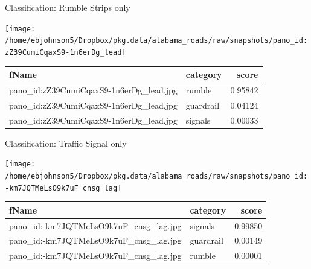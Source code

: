 \documentclass[ignorenonframetext,]{beamer}
\begin{document}
\begin{frame}{Classification: Rumble Strips only}

\begin{center}\texttt{[image: /home/ebjohnson5/Dropbox/pkg.data/alabama\_roads/raw/snapshots/pano\_id:zZ39CumiCqaxS9-1n6erDg\_lead]} \end{center}

\begin{table}[H]
\centering\begingroup\fontsize{6}{8}\selectfont

\begin{tabular}{l|l|r}
\hline
fName & category & score\\
\hline
pano\_id:zZ39CumiCqaxS9-1n6erDg\_lead.jpg & rumble & 0.95842\\
\hline
pano\_id:zZ39CumiCqaxS9-1n6erDg\_lead.jpg & guardrail & 0.04124\\
\hline
pano\_id:zZ39CumiCqaxS9-1n6erDg\_lead.jpg & signals & 0.00033\\
\hline
\end{tabular}\endgroup{}
\end{table}

\end{frame}

\begin{frame}{Classification: Traffic Signal only}

\begin{center}\texttt{[image: /home/ebjohnson5/Dropbox/pkg.data/alabama\_roads/raw/snapshots/pano\_id:-km7JQTMeLsO9k7uF\_cnsg\_lag]} \end{center}

\begin{table}[H]
\centering\begingroup\fontsize{6}{8}\selectfont

\begin{tabular}{l|l|r}
\hline
fName & category & score\\
\hline
pano\_id:-km7JQTMeLsO9k7uF\_cnsg\_lag.jpg & signals & 0.99850\\
\hline
pano\_id:-km7JQTMeLsO9k7uF\_cnsg\_lag.jpg & guardrail & 0.00149\\
\hline
pano\_id:-km7JQTMeLsO9k7uF\_cnsg\_lag.jpg & rumble & 0.00001\\
\hline
\end{tabular}\endgroup{}
\end{table}

\end{frame}
\end{document}
